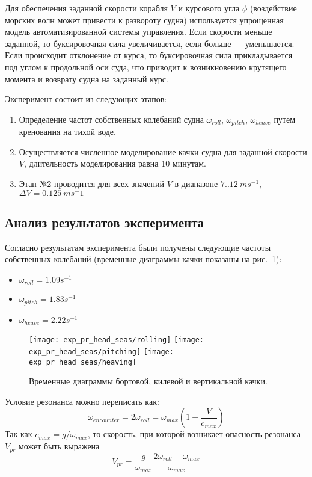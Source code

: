 Для обеспечения заданной скорости корабля $V$ и курсового угла $\phi$ (воздействие морских волн может привести к развороту судна) используется упрощенная модель автоматизированной системы управления. Если скорости меньше заданной, то буксировочная сила увеличивается, если больше --- уменьшается. Если происходит отклонение от курса, то буксировочная сила прикладывается под углом к продольной оси суда, что приводит к возникновению крутящего момента и возврату судна на заданный курс.

Эксперимент состоит из следующих этапов:
\begin{enumerate}
	\item	Определение частот собственных колебаний судна 
			$\omega_{roll}$, $\omega_{pitch}$, $\omega_{heave}$ путем кренования на тихой воде.
	\item	Осуществляется численное моделирование качки судна для заданной скорости $V$, длительность моделирования равна 10 минутам.
	\item	Этап №2	проводится для всех значений $V$ в диапазоне $7..12\ ms^{-1}$, $\Delta V=0.125\ ms^-1$ 
\end{enumerate}

\subsection{Анализ результатов эксперимента}

Согласно результатам эксперимента были получены следующие частоты собственных колебаний (временные диаграммы качки показаны на рис.~\ref{exp_pr_rolling}):
\begin{itemize}
	\item	$ \omega_{roll} = 1.09 s^{-1}$
	\item	$ \omega_{pitch} = 1.83 s^{-1}$
	\item	$ \omega_{heave} = 2.22 s^{-1}$
\end{itemize}

\begin{figure}[ht]
	\begin{center}
	\texttt{[image: exp\_pr\_head\_seas/rolling]}
	\texttt{[image: exp\_pr\_head\_seas/pitching]}
	\texttt{[image: exp\_pr\_head\_seas/heaving]}
	\end{center}
	\caption{Временные диаграммы бортовой, килевой и вертикальной качки.}
	\label{exp_pr_rolling}
\end{figure}

Условие резонанса можно переписать как:
\begin{equation}
	\omega_{encounter} = 2 \omega_{roll} = \omega_{max} \left(  1 + \frac{V}{c_{max}}  \right)
\end{equation}
Так как $c_{max} = g / \omega_{max}$, то скорость, при которой возникает опасность резонанса $V_{pr}$ может быть выражена
\begin{equation}
	V_{pr} = \frac{g}{\omega_{max}} \frac{ 2 \omega_{roll} - \omega_{max} }{ \omega_{max}}
\end{equation}

